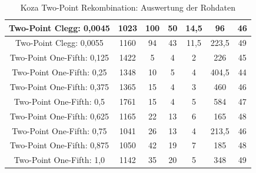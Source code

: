 \begin{table}[H]
\begin{tabular}{c | c | c | c | c | c | c}
		\hline
		Two-Point Clegg: 0,0045 & 1023 & 100 & 50 & 14,5 & 96 & 46\\
		\hline
		Two-Point Clegg: 0,0055 & 1160 & 94 & 43 & 11,5 & 223,5 & 49\\
		\hline
		Two-Point One-Fifth: 0,125 & 1422 & 5 & 4 & 2 & 226 & 45\\
		\hline
		Two-Point One-Fifth: 0,25 & 1348 & 10 & 5 & 4 & 404,5 & 44\\
		\hline
		Two-Point One-Fifth: 0,375 & 1365 & 15 & 4 & 3 & 460 & 46\\
		\hline
		Two-Point One-Fifth: 0,5 & 1761 & 15 & 4 & 5 & 584 & 47\\
		\hline
		Two-Point One-Fifth: 0,625 & 1165 & 22 & 13 & 6 & 165 & 48\\
		\hline
		Two-Point One-Fifth: 0,75 & 1041 & 26 & 13 & 4 & 213,5 & 46\\
		\hline
		Two-Point One-Fifth: 0,875 & 1050 & 42 & 19 & 7 & 185 & 48\\
		\hline
		Two-Point One-Fifth: 1,0 & 1142 & 35 & 20 & 5 & 348 & 49\\
	\end{tabular}
	\caption{Koza Two-Point Rekombination: Auswertung der Rohdaten}
	\label{table:kozaTwoPointRohdaten}
\end{table}




